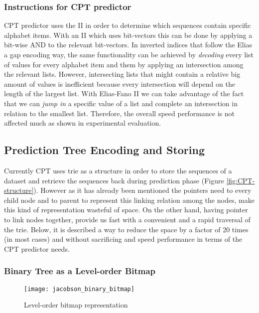 \subsubsection{Instructions for CPT predictor}
CPT predictor uses the II in order to determine which sequences contain specific alphabet items. With an II which uses bit-vectors this can be done by applying a bit-wise AND to the relevant bit-vectors. In inverted indices that follow the Elias a gap encoding way, the same functionality can be achieved by \emph{decoding} every list of values for every alphabet item and them by applying an intersection among the relevant lists. However, intersecting lists that might contain a relative big amount of values is inefficient because every intersection will depend on the length of the largest list. With Elias-Fano II we can take advantage of the fact that we can \emph{jump in} a specific value of a list and complete an intersection in relation to the smallest list. Therefore, the overall speed performance is not affected much as shown in experimental evaluation.

\subsection{Prediction Tree Encoding and Storing}
Currently CPT uses trie as a structure in order to store the sequences of a dataset and retrieve the sequences back during prediction phase (Figure \ref{fig:CPT-structure}). However as it has already been mentioned the pointers need to every child node and to parent to represent this linking relation among the nodes, make this kind of representation wasteful of space. On the other hand, having pointer to link nodes together, provide us fast with a convenient and a rapid traversal of the trie. Below, it is described a way to reduce the space by a factor of 20 times (in most cases) and without sacrificing and speed performance in terms of the CPT predictor needs.
\subsubsection{Binary Tree as a Level-order Bitmap}

\begin{figure}
	 \centering
    \texttt{[image: jacobson\_binary\_bitmap]}
    \caption{Level-order bitmap representation}
    \label{fig:binary_bm}
\end{figure}

